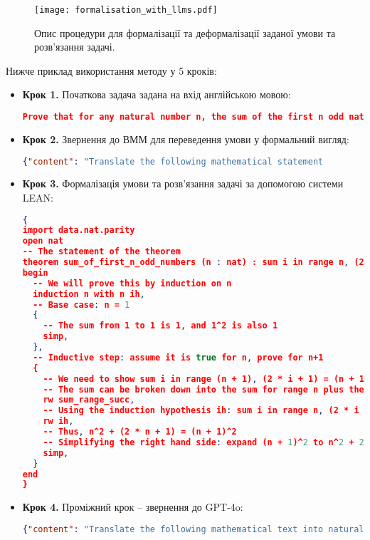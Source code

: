 \begin{figure}[!h]
    \centering
    \texttt{[image: formalisation\_with\_llms.pdf]}
    \caption{Опис процедури для формалізації та деформалізації заданої умови та розв’язання задачі.}
    \label{fig:formalisation_with_llms}
\end{figure}

Нижче приклад використання методу у 5 кроків:

\begin{itemize}
    \item \textbf{Крок 1.} Початкова задача задана на вхід англійською мовою:
\begin{lstlisting}[language=json, breaklines=true]
Prove that for any natural number n, the sum of the first n odd natural numbers is n^2.
\end{lstlisting}
    
    \item \textbf{Крок 2.} Звернення до ВММ для переведення умови у формальний вигляд:
\begin{lstlisting}[language=json, breaklines=true]
{"content": "Translate the following mathematical statement                         into LEAN: {Problem statement in natural language text}."}
\end{lstlisting}
    
    \item \textbf{Крок 3.} Формалізація умови та розв’язання задачі за допомогою системи LEAN:
    \newpage
    
\begin{lstlisting}[language=json, breaklines=true]
{
import data.nat.parity
open nat
-- The statement of the theorem
theorem sum_of_first_n_odd_numbers (n : nat) : sum i in range n, (2 * i + 1) = n^2 :=
begin
  -- We will prove this by induction on n
  induction n with n ih,
  -- Base case: n = 1
  { 
    -- The sum from 1 to 1 is 1, and 1^2 is also 1
    simp, 
  },
  -- Inductive step: assume it is true for n, prove for n+1
  { 
    -- We need to show sum i in range (n + 1), (2 * i + 1) = (n + 1)^2
    -- The sum can be broken down into the sum for range n plus the last term (2 * n + 1)
    rw sum_range_succ,
    -- Using the induction hypothesis ih: sum i in range n, (2 * i + 1) = n^2
    rw ih,
    -- Thus, n^2 + (2 * n + 1) = (n + 1)^2
    -- Simplifying the right hand side: expand (n + 1)^2 to n^2 + 2 * n + 1
    simp,
  }
end
}
\end{lstlisting}
    
    \item \textbf{Крок 4.} Проміжний крок – звернення до GPT-4o:
\begin{lstlisting}[language=json, breaklines=true]
{"content": "Translate the following mathematical text into natural                 language: {Problem statement in LEAN}."}
\end{lstlisting}
    

\end{itemize}
